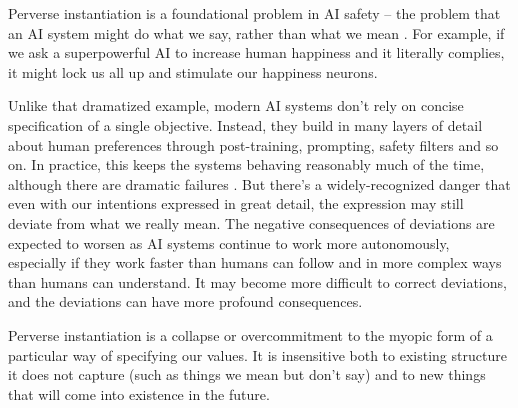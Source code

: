 \documentclass[12pt]{article}
\begin{document}
Perverse instantiation is a foundational problem in AI safety -- the problem that an AI system might do what we say, rather than what we mean \citep{amodei2016concrete,gabriel2020artificial,russell2019human,bostrom2014superintelligence, krakovna2020specification, grossman1986costs, hadfield2019incomplete, zhuang2020consequences, wiener1960some}. For example, if we ask a superpowerful AI to increase human happiness and it literally complies, it might lock us all up and stimulate our happiness neurons. 

Unlike that dramatized example, modern AI systems don't rely on concise specification of a single objective. Instead, they build in many layers of detail about human preferences through post-training, prompting, safety filters and so on. In practice, this keeps the systems behaving reasonably much of the time, although there are dramatic failures \citep{bbc2025parents}. But there's a widely-recognized danger that even with our intentions expressed in great detail, the expression may still deviate from what we really mean. The negative consequences of deviations are expected to worsen as AI systems continue to work more autonomously, especially if they work faster than humans can follow and in more complex ways than humans can understand. It may become more difficult to correct deviations, and the deviations can have more profound consequences.

Perverse instantiation is a collapse or overcommitment to the myopic form of a particular way of specifying our values. It is insensitive both to existing structure it does not capture (such as things we mean but don't say) and to new things that will come into existence in the future.




\end{document}
